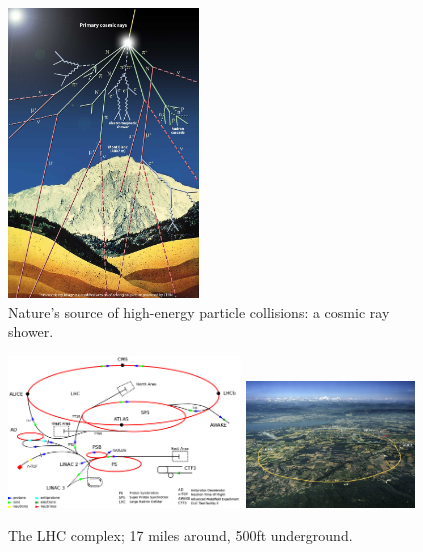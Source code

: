 \begin{figure}[hbp!]
\centering
\includegraphics[width=0.45\textwidth]{figs/cosmic-rays.jpg}
\caption{Nature's source of high-energy particle collisions: a cosmic ray shower.}
\label{fig:cosmicrays}
\end{figure}

\begin{figure}[hbp!]
\centering
\includegraphics[width=0.55\textwidth]{figs/lhcschematic.png}
\includegraphics[width=0.4\textwidth]{figs/lhc.jpg}
\caption{The LHC complex; 17 miles around, 500ft underground.}
\label{fig:lhc}
\end{figure}
